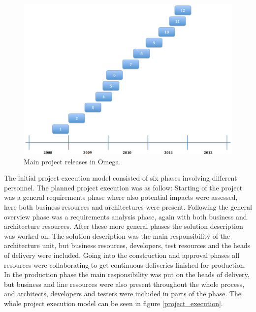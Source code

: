 \begin{figure}[H]
\centering
\includegraphics[trim = 0mm 0mm 0mm 0mm,width=155mm]{images/project_releases}
\caption{Main project releases in Omega.}
\label{releases}
\end{figure}

The initial project execution model consisted of six phases involving different personnel. The planned project execution was as follow: Starting of the project was a general requirements phase where also potential impacts were assessed, here both business resources and architectures were present. Following the general overview phase was a requirements analysis phase, again with both business and architecture resources. After these more general phases the solution description was worked on. The solution description was the main responsibility of the architecture unit, but business resources, developers, test resources and the heads of delivery were included. Going into the construction and approval phases all resources were collaborating to get continuous deliveries finished for production. In the production phase the main responsibility was put on the heads of delivery, but business and line resources were also present throughout the whole process, and architects, developers and testers were included in parts of the phase. The whole project execution model can be seen in figure \ref{project_execution}.

